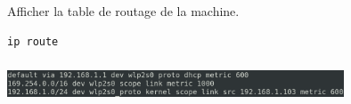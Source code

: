 \documentclass[svgnames,11pt]{beamer}
\begin{document}
\begin{frame}[fragile]
    \begin{activite}
        Afficher la table de routage de la machine.
        \begin{lstlisting}[language=bash]
ip route
                \end{lstlisting}
        \end{activite}
\end{frame}
\begin{frame}
    \frametitle{}

    \begin{center}
    \centering
    \includegraphics[width=10cm]{ressources/route.png}
    \label{IMG}
    \end{center}

\end{frame}
\end{document}

